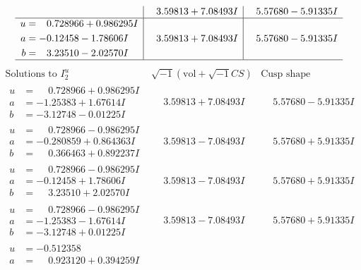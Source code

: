 \documentclass[1p]{elsarticle_modified}
\theoremstyle{definition}
\newcommand{\I}{\sqrt{-1}}
\begin{document}
$$\begin{array}{c|c|c}
 & \phantom{-}3.59813 + 7.08493 I & \phantom{-}5.57680 - 5.91335 I \\ \hline\begin{aligned}
u &= \phantom{-}0.728966 + 0.986295 I \\
a &= -0.12458 - 1.78606 I \\
b &= \phantom{-}3.23510 - 2.02570 I\end{aligned}
 & \phantom{-}3.59813 + 7.08493 I & \phantom{-}5.57680 - 5.91335 I\\
 \hline 
 \end{array}$$\newpage$$\begin{array}{c|c|c}  
\text{Solutions to }I^u_{2}& \I (\text{vol} + \sqrt{-1}CS) & \text{Cusp shape}\\
 \hline 
\begin{aligned}
u &= \phantom{-}0.728966 + 0.986295 I \\
a &= -1.25383 + 1.67614 I \\
b &= -3.12748 - 0.01225 I\end{aligned}
 & \phantom{-}3.59813 + 7.08493 I & \phantom{-}5.57680 - 5.91335 I \\ \hline\begin{aligned}
u &= \phantom{-}0.728966 - 0.986295 I \\
a &= -0.280859 + 0.864363 I \\
b &= \phantom{-}0.366463 + 0.892237 I\end{aligned}
 & \phantom{-}3.59813 - 7.08493 I & \phantom{-}5.57680 + 5.91335 I \\ \hline\begin{aligned}
u &= \phantom{-}0.728966 - 0.986295 I \\
a &= -0.12458 + 1.78606 I \\
b &= \phantom{-}3.23510 + 2.02570 I\end{aligned}
 & \phantom{-}3.59813 - 7.08493 I & \phantom{-}5.57680 + 5.91335 I \\ \hline\begin{aligned}
u &= \phantom{-}0.728966 - 0.986295 I \\
a &= -1.25383 - 1.67614 I \\
b &= -3.12748 + 0.01225 I\end{aligned}
 & \phantom{-}3.59813 - 7.08493 I & \phantom{-}5.57680 + 5.91335 I \\ \hline\begin{aligned}
u &= -0.512358\phantom{ +0.000000I} \\
a &= \phantom{-}0.923120 + 0.394259 I \\

\end{aligned}
\end{array}$$
\end{document}
